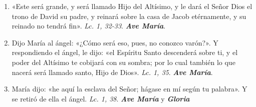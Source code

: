 \documentclass[../../devocionario.tex]{subfiles}
\begin{document}
\begin{enumerate}
        \item «Este será grande, y será llamado Hijo del Altísimo, y le dará el Señor Dios el trono de David su padre, 
                y reinará sobre la casa de Jacob etérnamente, y su reinado no tendrá fin».  \textit{Lc. 1, 32-33}. \textbf{\textit{Ave María}}.

        \item Dijo María al ángel: «¿Cómo será eso, pues, no conozco varón?». Y respondiendo el ángel, le dijo: «el Espíritu Santo descenderá sobre ti, 
                y el poder del Altísimo te cobijará con su sombra; por lo cual también lo que nacerá será llamado santo, Hijo de Dios». 
                \textit{Lc. 1, 35}. \textbf{\textit{Ave María}}.

        \item María dijo: «he aquí la esclava del Señor; hágase en mí según tu palabra». Y se retiró de ella el ángel. \textit{Lc. 1, 38}. 
                \textbf{\textit{Ave María}} y \textbf{\textit{Gloria}}

    \end{enumerate}
\end{document}
